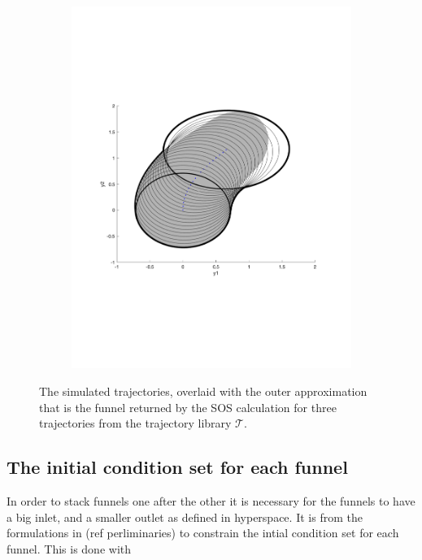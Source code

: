 \begin{figure}
\begin{subfigure}[b]{0.3\textwidth}
        \includegraphics[width=\textwidth]{figures/experiments/FunnelSim5}
    \end{subfigure}
    \caption{The simulated trajectories, overlaid with the outer approximation
      that is the funnel returned by the \ac{SOS} calculation for three
      trajectories from the trajectory library \(\mathcal{T}\).}
    \label{fig:funnel-simulated-overlaid}
\end{figure}

\subsection{The initial condition set for each funnel}

In order to stack funnels one after the other it is necessary for the funnels to
have a big inlet, and a smaller outlet as defined in hyperspace. It is from the
formulations in (ref perliminaries) to constrain the intial condition set for
each funnel. This is done with


